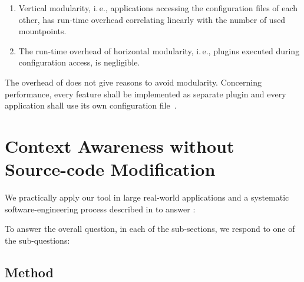 \begin{finding}
\fixtheorem
\begin{enumerate}
\item
Vertical modularity, i.\,e., applications accessing the configuration files of each other, has run-time overhead correlating linearly with the number of used mountpoints.
\item
The run-time overhead of horizontal modularity, i.\,e., plugins executed during configuration access, is negligible.
\end{enumerate}

\begin{implication}
The overhead of  does not give reasons to avoid modularity.
Concerning performance, every feature shall be implemented as separate plugin and every application shall use its own configuration file~\cite{raab2016improving}.
\end{implication}
\end{finding}






















\section{Context Awareness without Source-code Modification}
\label{sec:evaluation-unmodified}

We practically apply our tool in large real-world applications and a systematic software-engineering process described in  to answer :
\rqUnmodified*



To answer the overall question, in each of the sub-sections, we respond to one of the sub-questions:
\rqUnmodifiedWhich*
\rqUnmodifiedPractical*
\rqUnmodifiedOverhead*
\rqUnmodifiedPerformance*









\subsection{Method}

